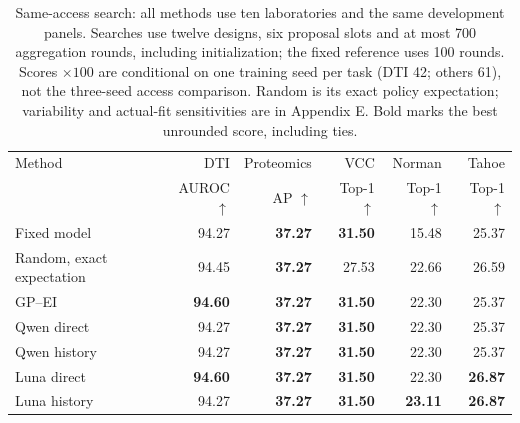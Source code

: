\begin{table}[t]
\caption{Same-access search: all methods use ten laboratories and the same development panels. Searches use twelve designs, six proposal slots and at most 700 aggregation rounds, including initialization; the fixed reference uses 100 rounds. Scores $\times100$ are conditional on one training seed per task (DTI 42; others 61), not the three-seed access comparison. Random is its exact policy expectation; variability and actual-fit sensitivities are in Appendix E. Bold marks the best unrounded score, including ties.}
\label{tab:rebuttal-matched-search-main}
\centering\small
\setlength{\tabcolsep}{4pt}
\begin{tabular}{@{}lrrrrr@{}}
\toprule
Method & DTI & Proteomics & VCC & Norman & Tahoe \\
 & AUROC $\uparrow$ & AP $\uparrow$ & Top-1 $\uparrow$ & Top-1 $\uparrow$ & Top-1 $\uparrow$ \\
\midrule
Fixed model & 94.27 & \textbf{37.27} & \textbf{31.50} & 15.48 & 25.37 \\
Random, exact expectation & 94.45 & \textbf{37.27} & 27.53 & 22.66 & 26.59 \\
GP--EI & \textbf{94.60} & \textbf{37.27} & \textbf{31.50} & 22.30 & 25.37 \\
Qwen direct & 94.27 & \textbf{37.27} & \textbf{31.50} & 22.30 & 25.37 \\
Qwen history & 94.27 & \textbf{37.27} & \textbf{31.50} & 22.30 & 25.37 \\
Luna direct & \textbf{94.60} & \textbf{37.27} & \textbf{31.50} & 22.30 & \textbf{26.87} \\
Luna history & 94.27 & \textbf{37.27} & \textbf{31.50} & \textbf{23.11} & \textbf{26.87} \\
\bottomrule
\end{tabular}
\end{table}
